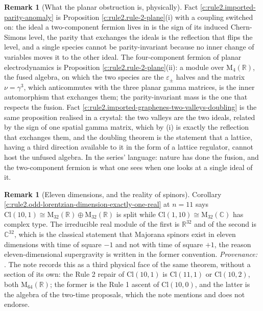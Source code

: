 \documentclass[11pt]{article}
\theoremstyle{definition}
\newtheorem{remark}[theorem]{Remark}
\theoremstyle{plain}
\providecommand{\C}{}\renewcommand{\C}{\mathbb{C}}
\providecommand{\Cl}{}\renewcommand{\Cl}{\mathrm{Cl}}
\providecommand{\Mat}{}\renewcommand{\Mat}{\mathrm{M}}
\providecommand{\R}{}\renewcommand{\R}{\mathbb{R}}
\begin{document}
\begin{remark}[What the planar obstruction is, physically]\label{c:note.rule2.what-planar-obstruction-physically}
Fact \ref{c:rule2.imported-parity-anomaly} is Proposition \ref{c:rule2.rule-2-plane}(i) with a coupling switched on: the ideal a two-component fermion lives in is the sign of its induced Chern-Simons level, the parity that exchanges the ideals is the reflection that flips the level, and a single species cannot be parity-invariant because no inner change of variables moves it to the other ideal. The four-component fermion of planar electrodynamics is Proposition \ref{c:rule2.rule-2-plane}(ii): a module over $\Mat_4(\R)$, the fused algebra, on which the two species are the $\varepsilon_\pm$ halves and the matrix $\nu = \gamma^3$, which anticommutes with the three planar gamma matrices, is the inner automorphism that exchanges them; the parity-invariant mass is the one that respects the fusion. Fact \ref{c:rule2.imported-graphenes-two-valleys-doubling} is the same proposition realised in a crystal: the two valleys are the two ideals, related by the sign of one spatial gamma matrix, which by (i) is exactly the reflection that exchanges them, and the doubling theorem is the statement that a lattice, having a third direction available to it in the form of a lattice regulator, cannot host the unfused algebra. In the series' language: nature has done the fusion, and the two-component fermion is what one sees when one looks at a single ideal of it.
\end{remark}

\begin{remark}[Eleven dimensions, and the reality of spinors]\label{c:note.rule2.eleven-dimensions-reality-spinors}
Corollary \ref{c:rule2.odd-lorentzian-dimension-exactly-one-real} at $n = 11$ says $\Cl(10,1) \cong \Mat_{32}(\R) \oplus \Mat_{32}(\R)$ is split while $\Cl(1,10) \cong \Mat_{32}(\C)$ has complex type. The irreducible real module of the first is $\R^{32}$ and of the second is $\C^{32}$, which is the classical statement that Majorana spinors exist in eleven dimensions with time of square $-1$ and not with time of square $+1$, the reason eleven-dimensional supergravity is written in the former convention. \emph{Provenance:} \cite{KugoTownsend1983, VanProeyen1999}. The note records this as a third physical face of the same theorem, without a section of its own: the Rule 2 repair of $\Cl(10,1)$ is $\Cl(11,1)$ or $\Cl(10,2)$, both $\Mat_{64}(\R)$; the former is the Rule 1 ascent of $\Cl(10,0)$, and the latter is the algebra of the two-time proposals, which the note mentions and does not endorse.
\end{remark}
\end{document}
